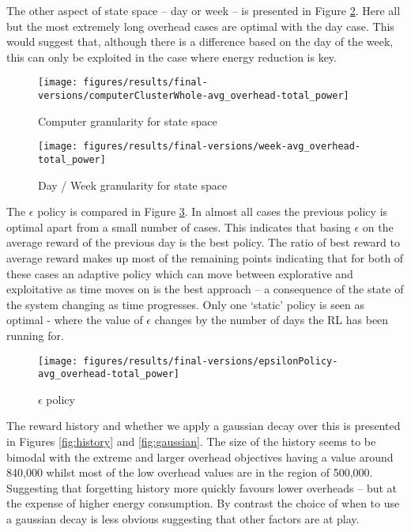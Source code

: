 \documentclass[10pt, conference, compsocconf]{IEEEtran}
\begin{document}
The other aspect of state space -- day or week -- is presented in Figure \ref{fig:week}. Here all but the most extremely long overhead cases are optimal with the day case. This would suggest that, although there is a difference based on the day of the week, this can only be exploited in the case where energy reduction is key.
\begin{figure}[H]
  \texttt{[image: figures/results/final-versions/computerClusterWhole-avg\_overhead-total\_power]}
  \caption{Computer granularity for state space}
  \label{fig:granularity}


\end{figure}
\begin{figure}[H]
  \texttt{[image: figures/results/final-versions/week-avg\_overhead-total\_power]}
  \caption{Day / Week granularity for state space}
  \label{fig:week}
\end{figure}
%
%
The $\epsilon$ policy is compared in Figure \ref{fig:policy}. In almost all cases the previous policy is optimal apart from a small number of cases. This indicates that basing $\epsilon$ on the average reward of the previous day is the best policy. The ratio of best reward to average reward makes up most of the remaining points indicating that for both of these cases an adaptive policy which can move between explorative and exploitative as time moves on is the best approach -- a consequence of the state of the system changing as time progresses. Only one `static' policy is seen as optimal - where the value of $\epsilon$ changes by the number of days the RL has been running for.
\begin{figure}[H]
  \texttt{[image: figures/results/final-versions/epsilonPolicy-avg\_overhead-total\_power]}
  \caption{$\epsilon$ policy}
  \label{fig:policy}
\end{figure}

The reward history and whether we apply a gaussian decay over this is presented in Figures \ref{fig:history} and \ref{fig:gaussian}. The size of the history seems to be bimodal with the extreme and larger overhead objectives having a value around 840,000 whilst most of the low overhead values are in the region of 500,000. Suggesting that forgetting history more quickly favours lower overheads -- but at the expense of higher energy consumption. {\color{green}By contrast the choice of when to use a gaussian decay is less obvious suggesting that other factors are at play.} 
\end{document}
